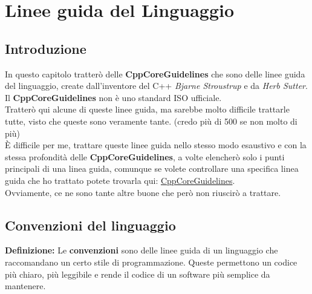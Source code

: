 
\chapter{Linee guida del Linguaggio} %


\section{Introduzione}

\textsf{\small In questo capitolo tratterò delle \textbf{CppCoreGuidelines} che sono delle linee guida del linguaggio, create dall'inventore del C++ \emph{Bjarne Stroustrup} e da \emph{Herb Sutter}.} \\

\textsf{\small Il \textbf{CppCoreGuidelines} non è uno standard ISO ufficiale.} \\

\textsf{\small Tratterò qui alcune di queste linee guida, ma sarebbe molto difficile trattarle tutte, visto che queste sono veramente tante. (credo più di 500 se non molto di più)} \\

\textsf{\small È difficile per me, trattare queste linee guida nello stesso modo esaustivo e con la stessa profondità delle \textbf{CppCoreGuidelines}, a volte elencherò solo i punti principali di una linea guida, comunque se volete controllare una specifica linea guida che ho trattato potete trovarla qui: \href{https://isocpp.github.io/CppCoreGuidelines/CppCoreGuidelines}{CppCoreGuidelines}.} \\
	
\textsf{\small Ovviamente, ce ne sono tante altre buone che però non riuscirò a trattare.} 

\break


\newpage

\section{Convenzioni del linguaggio}

\textsf{\small \textbf{Definizione: } Le \textbf{convenzioni} sono delle linee guida di un linguaggio che raccomandano un certo stile di programmazione. Queste permettono un codice più chiaro, più leggibile e rende il codice di un software più semplice da mantenere.} \\

